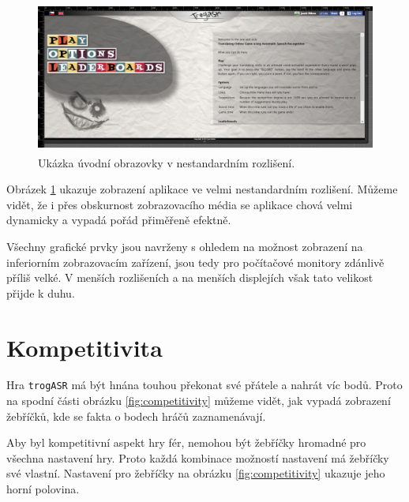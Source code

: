 \begin{figure}[h]
	\centering
	\includegraphics[width=140mm,height=50mm]{img/title_stretch.jpg}
	\caption{Ukázka úvodní obrazovky v nestandardním rozlišení.}
	\label{fig:title_stretch}
\end{figure}

Obrázek \ref{fig:title_stretch} ukazuje zobrazení aplikace ve velmi nestandardním rozlišení. Můžeme vidět, že i přes obskurnost zobrazovacího média se aplikace chová velmi dynamicky a vypadá pořád přiměřeně efektně.

Všechny grafické prvky jsou navrženy s ohledem na možnost zobrazení na inferiorním zobrazovacím zařízení, jsou tedy pro počítačové monitory zdánlivě příliš velké. V menších rozlišeních a na menších displejích však tato velikost přijde k duhu.

\section{Kompetitivita}

Hra \verb|trogASR| má být hnána touhou překonat své přátele a nahrát víc bodů. Proto na spodní části obrázku \ref{fig:competitivity} můžeme vidět, jak vypadá zobrazení žebříčků, kde se fakta o bodech hráčů zaznamenávají. 

Aby byl kompetitivní aspekt hry fér, nemohou být žebříčky hromadné pro všechna nastavení hry. Proto každá kombinace možností nastavení má žebříčky své vlastní. Nastavení pro žebříčky na obrázku \ref{fig:competitivity} ukazuje jeho horní polovina.

